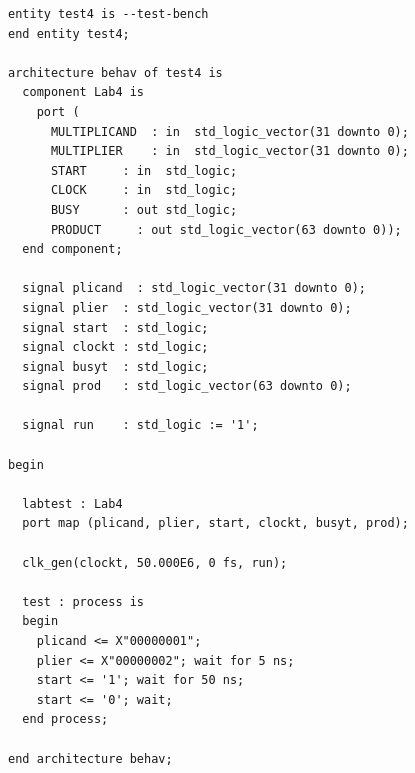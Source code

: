 \documentclass[11pt]{report}
\begin{document}
\begin{spacing}{1.5}
\begin{lstlisting}
entity test4 is --test-bench
end entity test4;

architecture behav of test4 is
  component Lab4 is
    port (
      MULTIPLICAND  : in  std_logic_vector(31 downto 0);
      MULTIPLIER    : in  std_logic_vector(31 downto 0);
      START     : in  std_logic;
      CLOCK     : in  std_logic;
      BUSY      : out std_logic;
      PRODUCT     : out std_logic_vector(63 downto 0));
  end component;

  signal plicand  : std_logic_vector(31 downto 0);
  signal plier  : std_logic_vector(31 downto 0);
  signal start  : std_logic;
  signal clockt : std_logic;
  signal busyt  : std_logic;
  signal prod   : std_logic_vector(63 downto 0);

  signal run    : std_logic := '1';

begin

  labtest : Lab4
  port map (plicand, plier, start, clockt, busyt, prod);

  clk_gen(clockt, 50.000E6, 0 fs, run);

  test : process is
  begin
    plicand <= X"00000001";
    plier <= X"00000002"; wait for 5 ns;
    start <= '1'; wait for 50 ns;
    start <= '0'; wait;
  end process;

end architecture behav;
\end{lstlisting}


\end{spacing}
\end{document}
